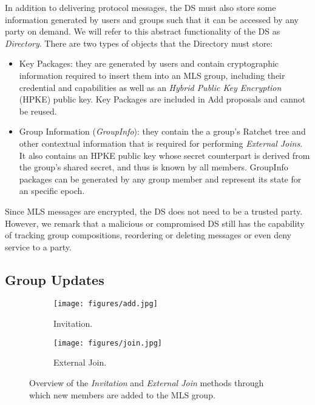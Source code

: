 \documentclass[preprint, 12pt]{elsarticle}
\begin{document}
In addition to delivering protocol messages, the DS must also store some information generated by users and groups such that it can be accessed by any party on demand. We will refer to this abstract functionality of the DS as \textit{Directory}. There are two types of objects that the Directory must store:

\begin{itemize}
    \item Key Packages: they are generated by users and contain cryptographic information required to insert them into an MLS group, including their credential and capabilities as well as an \textit{Hybrid Public Key Encryption} (HPKE) \cite{hpke} public key. Key Packages are included in Add proposals and cannot be reused.
    \item Group Information (\textit{GroupInfo}): they contain the a group's Ratchet tree and other contextual information that is required for performing \textit{External Joins}. It also contains an HPKE public key whose secret counterpart is derived from the group's shared secret, and thus is known by all members. GroupInfo packages can be generated by any group member and represent its state for an specific epoch.
\end{itemize}

Since MLS messages are encrypted, the DS does not need to be a trusted party. However, we remark that a malicious or compromised DS still has the capability of tracking group compositions, reordering or deleting messages or even deny service to a party. 

\subsection{Group Updates}

\begin{figure*}
    \centering
    \begin{subfigure}[b]{0.45\textwidth}
        \centering
        \texttt{[image: figures/add.jpg]}
        \caption{Invitation.}
        \label{fig:new_add}
    \end{subfigure}
    \begin{subfigure}[b]{0.45\textwidth}
        \centering
        \texttt{[image: figures/join.jpg]}
        \caption{External Join.}
        \label{fig:new_join}
    \end{subfigure}
    \caption{Overview of the \textit{Invitation} and \textit{External Join} methods through which new members are added to the MLS group.}
    \label{fig:new}
\end{figure*}
\end{document}
